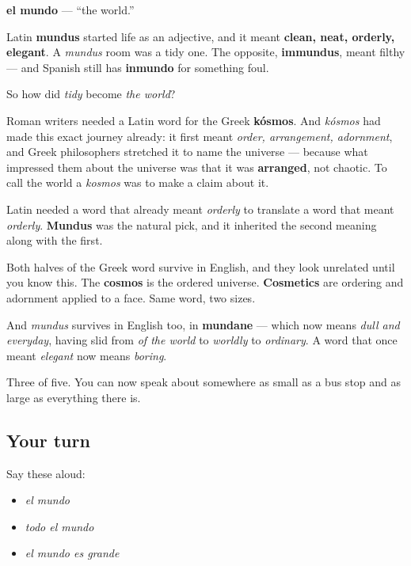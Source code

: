 \begin{cousinweb}
\textbf{el mundo} — \textquotedblleft{}the world.\textquotedblright{}

Latin \textbf{mundus} started life as an adjective, and it meant \textbf{clean, neat, orderly, elegant}. A \emph{mundus} room was a tidy one. The opposite, \textbf{immundus}, meant filthy — and Spanish still has \textbf{inmundo} for something foul.

So how did \emph{tidy} become \emph{the world}?

Roman writers needed a Latin word for the Greek \textbf{kósmos}. And \emph{kósmos} had made this exact journey already: it first meant \emph{order, arrangement, adornment}, and Greek philosophers stretched it to name the universe — because what impressed them about the universe was that it was \textbf{arranged}, not chaotic. To call the world a \emph{kosmos} was to make a claim about it.

Latin needed a word that already meant \emph{orderly} to translate a word that meant \emph{orderly}. \textbf{Mundus} was the natural pick, and it inherited the second meaning along with the first.

Both halves of the Greek word survive in English, and they look unrelated until you know this. The \textbf{cosmos} is the ordered universe. \textbf{Cosmetics} are ordering and adornment applied to a face. Same word, two sizes.

And \emph{mundus} survives in English too, in \textbf{mundane} — which now means \emph{dull and everyday}, having slid from \emph{of the world} to \emph{worldly} to \emph{ordinary}. A word that once meant \emph{elegant} now means \emph{boring}.
\end{cousinweb}

\begin{grammarlens}[title={What you've built}]
Three of five. You can now speak about somewhere as small as a bus stop and as large as everything there is.
\end{grammarlens}

\subsection*{Your turn}
Say these aloud:

\begin{itemize}
\raggedright
  \item \emph{el mundo}
  \item \emph{todo el mundo}
  \item \emph{el mundo es grande}
\end{itemize}

